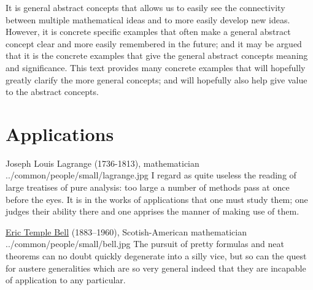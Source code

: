 It is general abstract concepts that allows us to easily see the connectivity
between multiple mathematical ideas and to more easily develop new ideas.
However, it is concrete specific examples that often make a general abstract concept clear
and more easily remembered in the future; and it may be argued that it is the concrete
examples that give the general abstract concepts meaning and significance.
This text provides many concrete examples that will hopefully greatly clarify
the more general concepts;
and will hopefully also help give value to the abstract concepts.

\section*{Applications}

\qboxnpq
  {
    Joseph Louis Lagrange (1736-1813), mathematician
    \footnotemark
  }
  {../common/people/small/lagrange.jpg}
  {I regard as quite useless the reading of large treatises of pure analysis:
    too large a number of methods pass at once before the eyes.
    It is in the works of applications that one must study them;
    one judges their ability there and one apprises the manner of making use of them.}

\qboxnps
  {
    \href{http://en.wikipedia.org/wiki/Eric_temple_bell}{Eric Temple Bell}
    (1883--1960), Scotish-American mathematician
    \footnotemark
  }
  {../common/people/small/bell.jpg}
  {The pursuit of pretty formulas and neat theorems
    can no doubt quickly degenerate into a silly vice,
    but so can the quest for austere generalities which are so very general indeed
    that they are incapable of application to any particular.}



